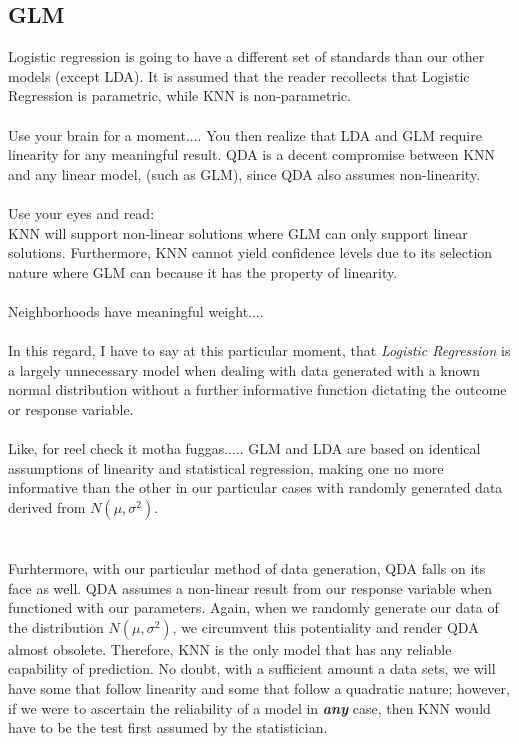 \documentclass[11pt, oneside]{article}
\begin{document}
\subsection*{GLM}
Logistic regression is going to have a different set of standards than our other models (except LDA). It is assumed that the reader recollects that Logistic Regression is parametric, while KNN is non-parametric.\\
\\
Use your brain for a moment.... You then realize that LDA and GLM require linearity for any meaningful result. QDA is a decent compromise between KNN and any linear model, (such as GLM), since QDA also assumes non-linearity.\\
\\
Use your eyes and read:\\
KNN will support non-linear solutions where GLM can only support linear solutions. Furthermore, KNN cannot yield confidence levels due to its selection nature where GLM can because it has the property of linearity.\\
\\
Neighborhoods have meaningful weight....\\
\\
In this regard, I have to say at this particular moment, that \emph{Logistic Regression} is a largely unnecessary model when dealing with data generated with a known normal distribution without a further informative function dictating the outcome or response variable.\\
\\
Like, for reel check it motha fuggas..... GLM and LDA are based on identical assumptions of linearity and statistical regression, making one no more informative than the other in our particular cases with randomly generated data derived from $N(\mu, \sigma^2)$.\\
\\
\\
Furhtermore, with our particular method of data generation, QDA falls on its face as well. QDA assumes a non-linear result from our response variable when functioned with our parameters. Again, when we randomly generate our data of the distribution $N(\mu, \sigma^2)$, we circumvent this potentiality and render QDA almost obsolete. Therefore, KNN is the only model that has any reliable capability of prediction. No doubt, with a sufficient amount a data sets, we will have some that follow linearity and some that follow a quadratic nature; however, if we were to ascertain the reliability of a model in \textbf{\emph{any}} case, then KNN would have to be the test first assumed by the statistician.
\end{document}
